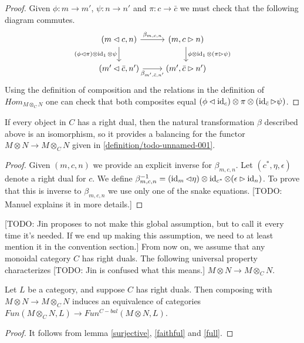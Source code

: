 \begin{proof}
  Given $\phi:m\to m'$, $\psi: n\to n'$ and $\pi:c\to \bar{c}$ we must check
  that the following diagram commutes.
  \[
    \begin{tikzcd}
      {(m\lhd c, n)} & {(m,c\rhd n)} \\
      {(m'\lhd \bar{c}, n')} & {(m',\bar{c}\rhd n')}
      \arrow["{\beta_{m,c,n}}", from=1-1, to=1-2]
      \arrow["{(\phi\lhd\pi)\otimes\id_1\otimes\psi}"', from=1-1, to=2-1]
      \arrow["{\phi\otimes\id_1\otimes(\pi\rhd\psi)}", from=1-2, to=2-2]
      \arrow["{\beta_{m',\bar{c},n'}}"', from=2-1, to=2-2]
    \end{tikzcd}
  \]
  Using the definition of composition and the relations in the definition of
  $Hom_{M\otimes_C N}$ one can check that both composites equal
  $(\phi\lhd\operatorname{id}_c)\otimes\pi\otimes(\operatorname{id}_{\bar{c}}\rhd\psi)$.
\end{proof}

\begin{lemma}\label{balanced}
  If every object in $C$ has a right dual, then the natural transformation
  $\beta$ described above is an isomorphism, so it provides a balancing for
  the functor $M\otimes N\to M\otimes_C N$ given in \ref{definition/todo-unnamed-001}.
\end{lemma}

\begin{proof}
  Given $(m,c,n)$ we provide an explicit inverse for $\beta_{m,c,n}$. Let
  $(c^*,\eta,\epsilon)$ denote a right dual for $c$. We define
  $\beta^{-1}_{m,c,n}=(\operatorname{id}_m\lhd\eta)\otimes\operatorname{id}_{c^*}\otimes (\epsilon\rhd\operatorname{id}_n)$.
  To prove that this is inverse to $\beta_{m,c,n}$ we use only one of the
  snake equations. [TODO: Manuel explains it in more details.]
\end{proof}

[TODO: Jin proposes to not make this global assumption, but to call it every
time it's needed. If we end up making this assumption, we need to at least
mention it in the convention section.]
From now on, we assume that any monoidal category $C$ has right duals. The following universal
property characterizes [TODO: Jin is confused what this means.] $M\otimes N \to M\otimes_C N$.

\begin{proposition}\label{univ_bal}
  Let $L$ be a category, and suppose $C$ has right duals. Then composing with
  $M\otimes N \to M\otimes_C N$ induces an equivalence of categories
  $Fun(M\otimes_C N,L)\to Fun^{C-bal}(M\otimes N,L)$.
\end{proposition}
\begin{proof}
  It follows from lemma \ref{surjective}, \ref{faithful} and \ref{full}.
\end{proof}

